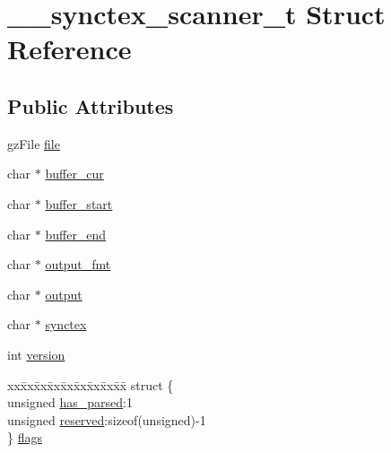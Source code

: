 \hypertarget{struct____synctex__scanner__t}{\section{\+\_\+\+\_\+synctex\+\_\+scanner\+\_\+t Struct Reference}
\label{struct____synctex__scanner__t}
}
\subsection*{Public Attributes}
\begin{DoxyCompactItemize}
\item 
gz\+File \hyperlink{struct____synctex__scanner__t_ad22da22fb23f1112ed4a8c6e54c30a91}{file}
\item 
char $\ast$ \hyperlink{struct____synctex__scanner__t_a3ace5951a9bb76b02d0cb52a807492c1}{buffer\+\_\+cur}
\item 
char $\ast$ \hyperlink{struct____synctex__scanner__t_ab45b78f37503ecad42a2d59db482aa84}{buffer\+\_\+start}
\item 
char $\ast$ \hyperlink{struct____synctex__scanner__t_a1bd226b12b6aaad54083ce8969273b32}{buffer\+\_\+end}
\item 
char $\ast$ \hyperlink{struct____synctex__scanner__t_a6b47843cf9ba4e354ec770fcf3224383}{output\+\_\+fmt}
\item 
char $\ast$ \hyperlink{struct____synctex__scanner__t_a0c31d194ab4bab987d0d93719731856e}{output}
\item 
char $\ast$ \hyperlink{struct____synctex__scanner__t_a7bdf8f488a5bb7ed9a21b4ded5db693f}{synctex}
\item 
int \hyperlink{struct____synctex__scanner__t_ad7c390700b8d63577dbd959a8a3310e7}{version}
\item 
\begin{tabbing}
xx\=xx\=xx\=xx\=xx\=xx\=xx\=xx\=xx\=\kill
struct \{\\
\>unsigned \hyperlink{struct____synctex__scanner__t_a837f7c06752eaf446f5d3beb9e612ebd}{has\_parsed}:1\\
\>unsigned \hyperlink{struct____synctex__scanner__t_ab769f28f38ed13f3b67bdeef142c8072}{reserved}:sizeof(unsigned)-\/1\\
\} \hyperlink{struct____synctex__scanner__t_a289f9b4a141138aeee44afa6d1bee45d}{flags}\\


\end{tabbing}
\end{DoxyCompactItemize}
